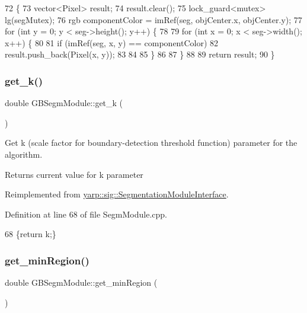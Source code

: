\begin{DoxyCode}
72 \{
73     vector<Pixel> result;
74     result.clear();
75     lock\_guard<mutex> lg(segMutex);
76     rgb componentColor = imRef(seg, objCenter.x, objCenter.y);
77     \textcolor{keywordflow}{for} (\textcolor{keywordtype}{int} y = 0; y < seg->height(); y++) \{
78 
79             \textcolor{keywordflow}{for} (\textcolor{keywordtype}{int} x = 0; x < seg->width(); x++) \{
80 
81               \textcolor{keywordflow}{if} (imRef(seg, x, y) == componentColor)
82                 result.push\_back(Pixel(x, y));
83 
84 
85             \}
86 
87         \}
88 
89     \textcolor{keywordflow}{return} result;
90 \}
\end{DoxyCode}
\mbox{\label{classGBSegmModule_a44bab99aa7a035e57a185673c040d2f6}} 
\subsubsection{\texorpdfstring{get\+\_\+k()}{get\_k()}}
{\footnotesize\ttfamily double G\+B\+Segm\+Module\+::get\+\_\+k (\begin{DoxyParamCaption}{ }\end{DoxyParamCaption})\hspace{0.3cm}{\ttfamily [virtual]}}



Get k (scale factor for boundary-\/detection threshold function) parameter for the algorithm. 

\begin{DoxyReturn}{Returns}
current value for k parameter 
\end{DoxyReturn}


Reimplemented from \hyperlink{classyarp_1_1sig_1_1SegmentationModuleInterface_a91f3d872a48599337d1d2f365ac4c31e}{yarp\+::sig\+::\+Segmentation\+Module\+Interface}.



Definition at line 68 of file Segm\+Module.\+cpp.


\begin{DoxyCode}
68 \{\textcolor{keywordflow}{return} k;\}
\end{DoxyCode}
\mbox{\label{classGBSegmModule_a2378b95e60b406a119947aa86b5bb9c4}} 
\subsubsection{\texorpdfstring{get\+\_\+min\+Region()}{get\_minRegion()}}
{\footnotesize\ttfamily double G\+B\+Segm\+Module\+::get\+\_\+min\+Region (\begin{DoxyParamCaption}{ }\end{DoxyParamCaption})\hspace{0.3cm}{\ttfamily [virtual]}}



